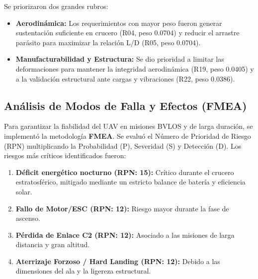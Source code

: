 \documentclass[12pt,a4paper]{article}
\begin{document}
Se priorizaron dos grandes rubros:
\begin{itemize}
    \item \textbf{Aerodinámica:} Los requerimientos con mayor peso fueron generar sustentación suficiente en crucero (R04, peso 0.0704) y reducir el arrastre parásito para maximizar la relación L/D (R05, peso 0.0704).
    \item \textbf{Manufacturabilidad y Estructura:} Se dio prioridad a limitar las deformaciones para mantener la integridad aerodinámica (R19, peso 0.0405) y a la validación estructural ante cargas y vibraciones (R22, peso 0.0386).
\end{itemize}

\subsection{Análisis de Modos de Falla y Efectos (FMEA)}
Para garantizar la fiabilidad del UAV en misiones BVLOS y de larga duración, se implementó la metodología \textbf{FMEA}. Se evaluó el Número de Prioridad de Riesgo (RPN) multiplicando la Probabilidad (P), Severidad (S) y Detección (D). 
Los riesgos más críticos identificados fueron:
\begin{enumerate}
    \item \textbf{Déficit energético nocturno (RPN: 15):} Crítico durante el crucero estratosférico, mitigado mediante un estricto balance de batería y eficiencia solar.
    \item \textbf{Fallo de Motor/ESC (RPN: 12):} Riesgo mayor durante la fase de ascenso.
    \item \textbf{Pérdida de Enlace C2 (RPN: 12):} Asociado a las misiones de larga distancia y gran altitud.
    \item \textbf{Aterrizaje Forzoso / Hard Landing (RPN: 12):} Debido a las dimensiones del ala y la ligereza estructural.
\end{enumerate}
\end{document}
